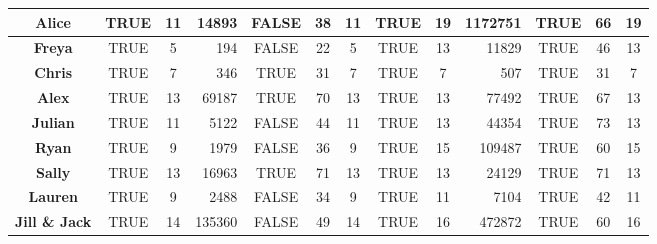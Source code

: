 \documentclass{report}
\theoremstyle{plain}
\begin{document}
\begin{figure}
\begin{tabular}{c|c|c|r|c|c|c|c|c|r|c|c|c|}
\multicolumn{1}{|c|}{\textbf{Alice}}                 & TRUE            & 11             & 14893         & FALSE          & 38               & 11                  & TRUE            & 19             & 1172751       & TRUE           & 66               & 19                  \\ \hline
\multicolumn{1}{|c|}{\textbf{Freya}}                 & TRUE            & 5              & 194           & FALSE          & 22               & 5                   & TRUE            & 13             & 11829         & TRUE           & 46               & 13                  \\ \hline
\multicolumn{1}{|c|}{\textbf{Chris}}                 & TRUE            & 7              & 346           & TRUE           & 31               & 7                   & TRUE            & 7              & 507           & TRUE           & 31               & 7                   \\ \hline
\multicolumn{1}{|c|}{\textbf{Alex}}                  & TRUE            & 13             & 69187         & TRUE           & 70               & 13                  & TRUE            & 13             & 77492         & TRUE           & 67               & 13                  \\ \hline
\multicolumn{1}{|c|}{\textbf{Julian}}                & TRUE            & 11             & 5122          & FALSE          & 44               & 11                  & TRUE            & 13             & 44354         & TRUE           & 73               & 13                  \\ \hline
\multicolumn{1}{|c|}{\textbf{Ryan}}                  & TRUE            & 9              & 1979          & FALSE          & 36               & 9                   & TRUE            & 15             & 109487        & TRUE           & 60               & 15                  \\ \hline
\multicolumn{1}{|c|}{\textbf{Sally}}                 & TRUE            & 13             & 16963         & TRUE           & 71               & 13                  & TRUE            & 13             & 24129         & TRUE           & 71               & 13                  \\ \hline
\multicolumn{1}{|c|}{\textbf{Lauren}}                & TRUE            & 9              & 2488          & FALSE          & 34               & 9                   & TRUE            & 11             & 7104          & TRUE           & 42               & 11                  \\ \hline
\multicolumn{1}{|c|}{\textbf{Jill \& Jack}}          & TRUE            & 14             & 135360        & FALSE          & 49               & 14                  & TRUE            & 16             & 472872        & TRUE           & 60               & 16                  \\ \hline

\end{tabular}
\end{figure}
\end{document}
